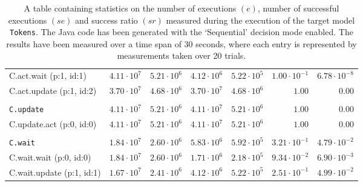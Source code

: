 \begin{table}[htbp]
{\begin{tabular}{lrrrrrr}
\hspace{3mm}C.act.wait (p:1, id:1)    & $4.11 \cdot 10^{7}$ & $5.21 \cdot 10^{6}$ & $4.12 \cdot 10^{6}$ & $5.22 \cdot 10^{5}$ & $1.00 \cdot 10^{-1}$ & $6.78 \cdot 10^{-8}$ \\
\hspace{3mm}C.act.update (p:1, id:2)  & $3.70 \cdot 10^{7}$ & $4.68 \cdot 10^{6}$ & $3.70 \cdot 10^{7}$ & $4.68 \cdot 10^{6}$ &               $1.00$ &               $0.00$ \\
\\[-8pt]\texttt{C.update}             & $4.11 \cdot 10^{7}$ & $5.21 \cdot 10^{6}$ & $4.11 \cdot 10^{7}$ & $5.21 \cdot 10^{6}$ &               $1.00$ &               $0.00$ \\
\hspace{3mm}C.update.act (p:0, id:0)  & $4.11 \cdot 10^{7}$ & $5.21 \cdot 10^{6}$ & $4.11 \cdot 10^{7}$ & $5.21 \cdot 10^{6}$ &               $1.00$ &               $0.00$ \\
\\[-8pt]\texttt{C.wait}               & $1.84 \cdot 10^{7}$ & $2.60 \cdot 10^{6}$ & $5.83 \cdot 10^{6}$ & $5.92 \cdot 10^{5}$ & $3.21 \cdot 10^{-1}$ & $4.79 \cdot 10^{-2}$ \\
\hspace{3mm}C.wait.wait (p:0, id:0)   & $1.84 \cdot 10^{7}$ & $2.60 \cdot 10^{6}$ & $1.71 \cdot 10^{6}$ & $2.18 \cdot 10^{5}$ & $9.34 \cdot 10^{-2}$ & $6.90 \cdot 10^{-3}$ \\
\hspace{3mm}C.wait.update (p:1, id:1) & $1.67 \cdot 10^{7}$ & $2.41 \cdot 10^{6}$ & $4.12 \cdot 10^{6}$ & $5.22 \cdot 10^{5}$ & $2.51 \cdot 10^{-1}$ & $4.99 \cdot 10^{-2}$ \\
\bottomrule
\end{tabular}
}
\caption{A table containing statistics on the number of executions $(e)$, number of successful executions $(se)$ and success ratio $(sr)$ measured during the execution of the target model \texttt{Tokens}. The Java code has been generated with the `Sequential' decision mode enabled. The results have been measured over a time span of 30 seconds, where each entry is represented by measurements taken over 20 trials.}
\label{table:frequency_results_tokens_sequential}
\end{table}